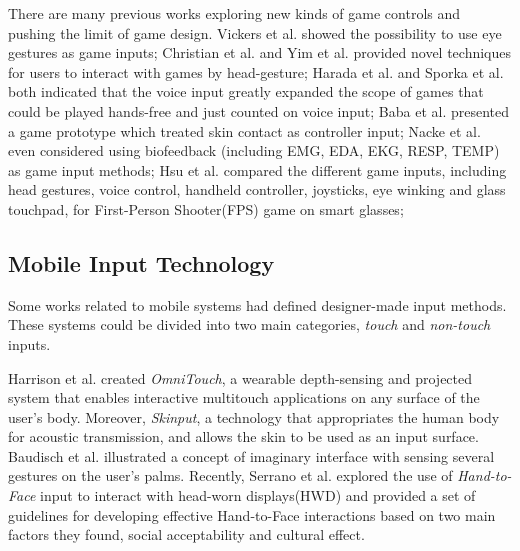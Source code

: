 \documentclass{sigchi}
\begin{document}
    There are many previous works exploring new kinds of game controls and pushing the limit of game design. Vickers et al.\cite{Vickers:2013:PLT:2531922.2514856} showed the possibility to use eye gestures as game inputs; Christian et al.\cite{Christian:2014:VSI:2559206.2580103} and Yim et al.\cite{Yim:2008:EDD:1496984.1497033} provided novel techniques for users to interact with games by head-gesture; 
    Harada et al.\cite{Harada:2011:VGI:2042053.2042059} and Sporka et al. \cite{Sporka:2006:NIS:1168987.1169023} both indicated that the voice input greatly expanded the scope of games that could be played hands-free and just counted on voice input; 
    Baba et al.\cite{Baba:2007:VGU:1278280.1278285} presented a game prototype which treated skin contact as controller input; Nacke et al.\cite{Nacke:2011:BGD:1978942.1978958} even considered using biofeedback (including EMG, EDA, EKG, RESP, TEMP) as game input methods;
    Hsu et al.\cite{Hsu:2014:GSE:2663204.2669623} compared the different game inputs, including head gestures, voice control, handheld controller, joysticks, eye winking and glass touchpad, for First-Person Shooter(FPS) game on smart glasses; 


    \subsection{Mobile Input Technology}
    Some works related to mobile systems had defined designer-made input methods. These systems could be divided into two main categories, \emph{touch} and \emph{non-touch} inputs. 

    Harrison et al.\cite{Harrison:2011:OWM:2047196.2047255} created \textsl{OmniTouch}, a wearable depth-sensing and projected system that enables interactive multitouch applications on any surface of the user's body. Moreover, \textsl{Skinput}\cite{Harrison:2010:SAB:1753326.1753394}, a technology that appropriates the human body for acoustic transmission, and allows the skin to be used as an input surface. Baudisch et al.\cite{Gustafson:2011:IPL:2047196.2047233} illustrated a concept of imaginary interface with sensing several gestures on the user's palms. Recently, Serrano et al.\cite{Serrano:2014:EUH:2611247.2556984} explored the use of \textsl{Hand-to-Face} input to interact with head-worn displays(HWD) and provided a set of guidelines for developing effective Hand-to-Face interactions based on two main factors they found, social acceptability and cultural effect.
\end{document}
